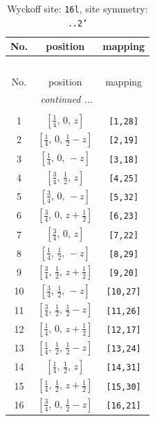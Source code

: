 \documentclass[fleqn,8pt]{jsarticle}
\begin{document}
\renewcommand{\arraystretch}{1.2}
\begin{longtable}{ccc}
\caption{Wyckoff site: {\tt 16l}, site symmetry: {\tt ..2'}}
 \\
 \hline \hline
No. & position & mapping \\ \hline \endfirsthead

\multicolumn{2}{l}{\tablename\ \thetable{}} \\
 \hline \hline
No. & position & mapping \\ \hline \endhead

 \hline \hline
\multicolumn{2}{r}{\footnotesize\it continued ...} \\ \endfoot

 \hline \hline
\multicolumn{2}{r}{} \\ \endlastfoot

1 & $\left[ \frac{1}{4},\, 0,\, z \right]$ & {\tt [1,28]} \\ \hline
2 & $\left[ \frac{1}{4},\, 0,\, \frac{1}{2} - z \right]$ & {\tt [2,19]} \\ \hline
3 & $\left[ \frac{1}{4},\, 0,\, - z \right]$ & {\tt [3,18]} \\ \hline
4 & $\left[ \frac{3}{4},\, \frac{1}{2},\, z \right]$ & {\tt [4,25]} \\ \hline
5 & $\left[ \frac{3}{4},\, 0,\, - z \right]$ & {\tt [5,32]} \\ \hline
6 & $\left[ \frac{3}{4},\, 0,\, z + \frac{1}{2} \right]$ & {\tt [6,23]} \\ \hline
7 & $\left[ \frac{3}{4},\, 0,\, z \right]$ & {\tt [7,22]} \\ \hline
8 & $\left[ \frac{1}{4},\, \frac{1}{2},\, - z \right]$ & {\tt [8,29]} \\ \hline
9 & $\left[ \frac{3}{4},\, \frac{1}{2},\, z + \frac{1}{2} \right]$ & {\tt [9,20]} \\ \hline
10 & $\left[ \frac{3}{4},\, \frac{1}{2},\, - z \right]$ & {\tt [10,27]} \\ \hline
11 & $\left[ \frac{3}{4},\, \frac{1}{2},\, \frac{1}{2} - z \right]$ & {\tt [11,26]} \\ \hline
12 & $\left[ \frac{1}{4},\, 0,\, z + \frac{1}{2} \right]$ & {\tt [12,17]} \\ \hline
13 & $\left[ \frac{1}{4},\, \frac{1}{2},\, \frac{1}{2} - z \right]$ & {\tt [13,24]} \\ \hline
14 & $\left[ \frac{1}{4},\, \frac{1}{2},\, z \right]$ & {\tt [14,31]} \\ \hline
15 & $\left[ \frac{1}{4},\, \frac{1}{2},\, z + \frac{1}{2} \right]$ & {\tt [15,30]} \\ \hline
16 & $\left[ \frac{3}{4},\, 0,\, \frac{1}{2} - z \right]$ & {\tt [16,21]} \\
\end{longtable}
\end{document}
